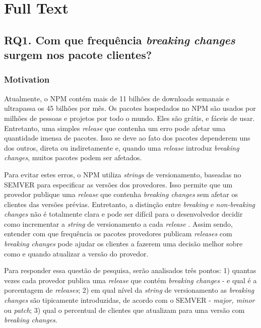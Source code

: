 \chapter{Full Text}

\section{RQ1. Com que frequência \textit{breaking changes} surgem nos pacote clientes?}
\label{sec:rq1}

\subsection{Motivation}
\label{mot:rq1}

Atualmente, o \Gls{NPM} contém mais de 11 bilhões de downloads semanais e ultrapassa os 45 bilhões por mês. Os pacotes hospedados no \Gls{NPM} são usados por milhões de pessoas e projetos por todo o mundo. Eles são grátis, e fáceis de usar. Entretanto, uma simples \textit{release} que contenha um erro pode afetar uma quantidade imensa de pacotes. Isso se deve ao fato dos pacotes dependerem uns dos outros, direta ou indiretamente e, quando uma \textit{release} introduz \textit{breaking changes}, muitos pacotes podem ser afetados.

Para evitar estes erros, o \Gls{NPM} utiliza \textit{strings} de versionamento, baseadas no \Gls{SEMVER} para especificar as versões dos provedores. Isso permite que um provedor publique uma \textit{release} que contenha \textit{breaking changes} sem afetar os clientes das versões prévias. Entretanto, a distinção entre \textit{breaking} e \textit{non-breaking changes} não é totalmente clara e pode ser difícil para o desenvolvedor decidir como incrementar a \textit{string} de versionamento a cada \textit{release} \cite{noregrets2018}. Assim sendo, entender com que frequência os pacotes provedores publicam \textit{releases} com \textit{breaking changes} pode ajudar os clientes a fazerem uma decisão melhor sobre como e quando atualizar a versão do provedor.

Para responder essa questão de pesquisa, serão analisados três pontos: 1) quantas vezes cada provedor publica uma \textit{release} que contém \textit{breaking changes} - e qual é a porcentagem de \textit{releases}; 2) em qual nível da \textit{string} de versionamento as \textit{breaking changes} são tipicamente introduzidas, de acordo com o \Gls{SEMVER} - \textit{major, minor} ou \textit{patch}; 3) qual o percentual de clientes que atualizam para uma versão com \textit{breaking changes}.

